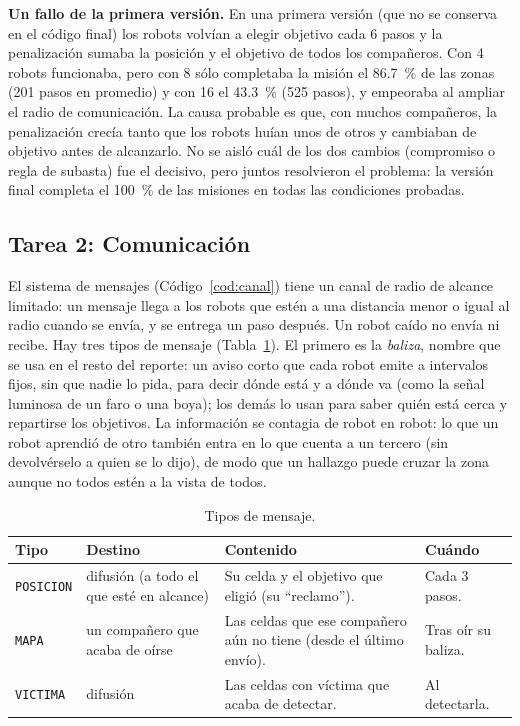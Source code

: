 \documentclass[11pt,letterpaper]{article}
\begin{document}
\textbf{Un fallo de la primera versión.} En una primera versión (que no se conserva en el código final) los robots volvían a elegir objetivo cada 6 pasos y la penalización sumaba la posición y el objetivo de todos los compañeros. Con 4 robots funcionaba, pero con 8 sólo completaba la misión el 86.7~\% de las zonas (201 pasos en promedio) y con 16 el 43.3~\% (525 pasos), y empeoraba al ampliar el radio de comunicación. La causa probable es que, con muchos compañeros, la penalización crecía tanto que los robots huían unos de otros y cambiaban de objetivo antes de alcanzarlo. No se aisló cuál de los dos cambios (compromiso o regla de subasta) fue el decisivo, pero juntos resolvieron el problema: la versión final completa el 100~\% de las misiones en todas las condiciones probadas.

\subsection{Tarea 2: Comunicación}

El sistema de mensajes (Código~\ref{cod:canal}) tiene un canal de radio de alcance limitado: un mensaje llega a los robots que estén a una distancia menor o igual al radio cuando se envía, y se entrega un paso después. Un robot caído no envía ni recibe. Hay tres tipos de mensaje (Tabla~\ref{tab:mensajes}). El primero es la \emph{baliza}, nombre que se usa en el resto del reporte: un aviso corto que cada robot emite a intervalos fijos, sin que nadie lo pida, para decir dónde está y a dónde va (como la señal luminosa de un faro o una boya); los demás lo usan para saber quién está cerca y repartirse los objetivos. La información se contagia de robot en robot: lo que un robot aprendió de otro también entra en lo que cuenta a un tercero (sin devolvérselo a quien se lo dijo), de modo que un hallazgo puede cruzar la zona aunque no todos estén a la vista de todos.

\begin{table}[H]
\centering
\caption{Tipos de mensaje.}
\label{tab:mensajes}
\small
\begin{tabular}{@{}p{2.1cm}p{2.3cm}p{4.6cm}p{3.2cm}@{}}
\toprule
Tipo & Destino & Contenido & Cuándo \\
\midrule
\texttt{POSICION} & difusión (a todo el que esté en alcance) & Su celda y el objetivo que eligió (su ``reclamo''). & Cada 3 pasos. \\
\texttt{MAPA} & un compañero que acaba de oírse & Las celdas que ese compañero aún no tiene (desde el último envío). & Tras oír su baliza. \\
\texttt{VICTIMA} & difusión & Las celdas con víctima que acaba de detectar. & Al detectarla. \\
\bottomrule
\end{tabular}
\end{table}
\end{document}
